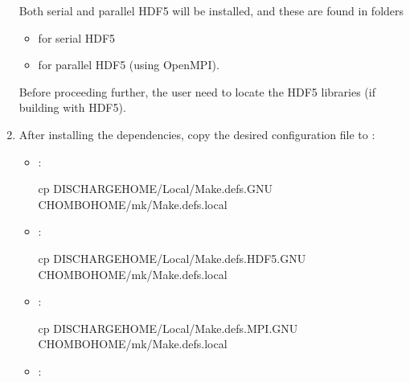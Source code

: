 \documentclass[letterpaper,10pt,english]{sphinxmanual}
\begin{document}
\begin{enumerate}
Both serial and parallel HDF5 will be installed, and these are  found in folders
\begin{itemize}
\item {} 
 for serial HDF5

\item {} 
 for parallel HDF5 (using OpenMPI).

\end{itemize}

Before proceeding further, the user need to locate the HDF5 libraries (if building with HDF5).

\item {} 
After installing the dependencies, copy the desired configuration file to :
\begin{itemize}
\item {} 
:

\begin{sphinxVerbatim}[commandchars=\\\{\},formatcom=\scriptsize]
cp \PYGZdl{}DISCHARGE\PYGZus{}HOME/Local/Make.defs.GNU \PYGZdl{}CHOMBO\PYGZus{}HOME/mk/Make.defs.local
\end{sphinxVerbatim}

\item {} 
:

\begin{sphinxVerbatim}[commandchars=\\\{\},formatcom=\scriptsize]
cp \PYGZdl{}DISCHARGE\PYGZus{}HOME/Local/Make.defs.HDF5.GNU \PYGZdl{}CHOMBO\PYGZus{}HOME/mk/Make.defs.local
\end{sphinxVerbatim}

\item {} 
:

\begin{sphinxVerbatim}[commandchars=\\\{\},formatcom=\scriptsize]
cp \PYGZdl{}DISCHARGE\PYGZus{}HOME/Local/Make.defs.MPI.GNU \PYGZdl{}CHOMBO\PYGZus{}HOME/mk/Make.defs.local
\end{sphinxVerbatim}

\item {} 
:


\end{itemize}
\end{enumerate}
\end{document}
